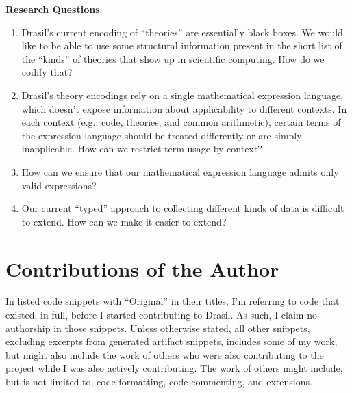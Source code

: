 \noindent\textbf{Research Questions}:

\begin{enumerate}

      \item[\namedlabel{rq:modelkinds}{RQ1}] Drasil's current encoding of
            ``theories'' are essentially black boxes. We would like to be able
            to use some structural information present in the short list of the
            ``kinds'' of theories that show up in scientific computing. How do
            we codify that?

      \item[\namedlabel{rq:lang_division}{RQ2}] Drasil's theory encodings rely
            on a single mathematical expression language, which doesn't expose
            information about applicability to different contexts. In each
            context (e.g., code, theories, and common arithmetic), certain terms
            of the expression language should be treated differently or are
            simply inapplicable. How can we restrict term usage by context?

      \item[\namedlabel{rq:typing}{RQ3}] How can we ensure that our mathematical
            expression language admits only valid expressions?

      \item[\namedlabel{rq:chunkdb}{RQ4}] Our current ``typed'' approach to
            collecting different kinds of data is difficult to extend. How can
            we make it easier to extend?

\end{enumerate}

\section{Contributions of the Author}
\label{chap:intro:sec:contributions}

In listed code snippets with ``Original'' in their titles, I'm referring to code
that existed, in full, before I started contributing to Drasil. As such, I claim
no authorship in those snippets. Unless otherwise stated, all other snippets,
excluding excerpts from generated artifact snippets, includes some of my work,
but might also include the work of others who were also contributing to the
project while I was also actively contributing. The work of others might
include, but is not limited to, code formatting, code commenting, and
extensions.

